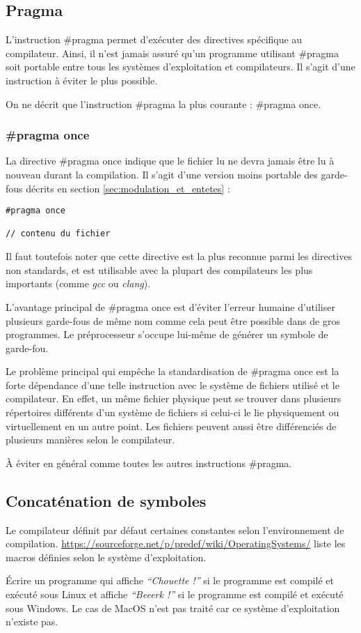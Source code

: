\documentclass[../../../main.tex]{subfiles}
\begin{document}
\subsection{Pragma} \label{sub:pragma}
L'instruction \textsf{\#pragma} permet d'exécuter des directives spécifique au compilateur. Ainsi, il n'est jamais assuré qu'un programme utilisant \textsf{\#pragma} soit portable entre tous les systèmes d'exploitation et compilateurs. Il s'agit d'une instruction à éviter le plus possible.

On ne décrit que l'instruction \textsf{\#pragma} la plus courante : \textsf{\#pragma once}.
\subsubsection{\#pragma once}
La directive \textsf{\#pragma once} indique que le fichier lu ne devra jamais être lu à nouveau durant la compilation. Il s'agit d'une version moins portable des garde-fous décrits en section \ref{sec:modulation_et_entetes} :
\begin{verbatim}
#pragma once

// contenu du fichier
\end{verbatim}
Il faut toutefois noter que cette directive est la plus reconnue parmi les directives non standards, et est utilisable avec la plupart des compilateurs les plus importants (comme \textit{gcc} ou \textit{clang}).

L'avantage principal de \textsf{\#pragma once} est d'éviter l'erreur humaine d'utiliser plusieurs garde-fous de même nom comme cela peut être possible dans de gros programmes. Le préprocesseur s'occupe lui-même de générer un symbole de garde-fou.

Le problème principal qui empêche la standardisation de \textsf{\#pragma once} est la forte dépendance d'une telle instruction avec le système de fichiers utilisé et le compilateur. En effet, un même fichier physique peut se trouver dans plusieurs répertoires différents d'un système de fichiers si celui-ci le lie physiquement ou virtuellement en un autre point. Les fichiers peuvent aussi être différenciés de plusieurs manières selon le compilateur.

À éviter en général comme toutes les autres instructions \textsf{\#pragma}.
\subsection{Concaténation de symboles} \label{sub:concatenation_de_symboles}
Le compilateur définit par défaut certaines constantes selon l'environnement de compilation. \url{https://sourceforge.net/p/predef/wiki/OperatingSystems/} liste les macros définies selon le système d'exploitation.

Écrire un programme qui affiche \textit{``Chouette !''} si le programme est compilé et exécuté sous Linux et affiche \textit{``Beeerk !''} si le programme est compilé et exécuté sous Windows. Le cas de MacOS n'est pas traité car ce système d'exploitation n'existe pas.
\end{document}
